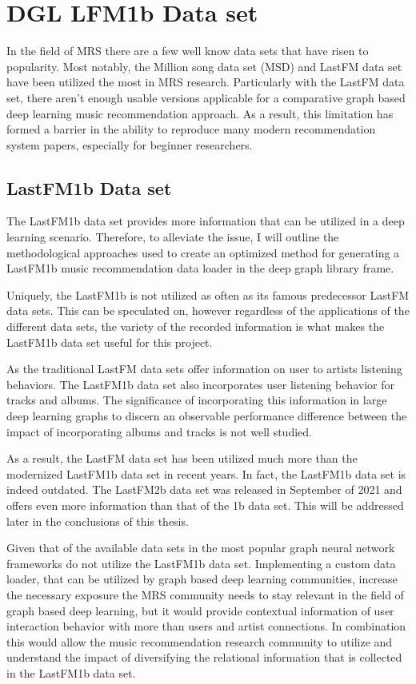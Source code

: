 \section{DGL LFM1b Data set}

In the field of MRS there are a few well know data sets that have risen to popularity. Most notably, the Million song data set (MSD) and LastFM data set have been utilized the most in MRS research. Particularly with the LastFM data set, there aren't enough usable versions applicable for a comparative graph based deep learning music recommendation approach. As a result, this limitation has formed a barrier in the ability to reproduce many modern recommendation system papers, especially for beginner researchers. 

\subsection{LastFM1b Data set}

The LastFM1b data set provides more information that can be utilized in a deep learning scenario. Therefore, to alleviate the issue, I will outline the methodological approaches used to create an optimized method for generating a LastFM1b music recommendation data loader in the deep graph library frame. 

Uniquely, the LastFM1b is not utilized as often as its famous predecessor LastFM data sets. This can be speculated on, however regardless of the applications of the different data sets, the variety of the recorded information is what makes the LastFM1b data set useful for this project. 

As the traditional LastFM data sets offer information on user to artists listening behaviors. The LastFM1b data set also incorporates user listening behavior for tracks and albums. The significance of incorporating this information in large deep learning graphs to discern an observable performance difference between the impact of incorporating albums and tracks is not well studied. \cite{hgRepAndApp2022} \cite{Schedl2016}

As a result, the LastFM data set has been utilized much more than the modernized LastFM1b data set in recent years. In fact, the LastFM1b data set is indeed outdated. The LastFM2b data set was released in September of 2021 and offers even more information than that of the 1b data set. This will be addressed later in the conclusions of this thesis.


Given that of the available data sets in the most popular graph neural network frameworks do not utilize the LastFM1b data set. Implementing a custom data loader, that can be utilized by graph based deep learning communities, increase the necessary exposure the MRS community needs to stay relevant in the field of graph based deep learning, but it would provide contextual information of user interaction behavior with more than users and artist connections. In combination this would allow the music recommendation research community to utilize and understand the impact of diversifying the relational information that is collected in the LastFM1b data set.

